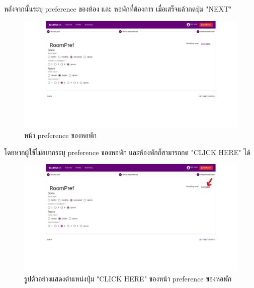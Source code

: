 หลังจากนั้นระบุ preference ของห้อง และ หอพักที่ต้องการ เมื่อเสร็จแล้วกดปุ่ม "NEXT"
\begin{figure}[h]
  \begin{center}
    \includegraphics[width=\linewidth]{photo/web/student/dorm-def.jpeg}
  \end{center}
  \caption{หน้า preference ของหอพัก}
\end{figure}
%
\newline
โดยหากผู้ใช้ไม่อยากระบุ preference ของหอพัก และห้องพักก็สามารถกด "CLICK HERE" ได้
\begin{figure}[h]
  \begin{center}
    \includegraphics[width=\linewidth]{photo/web/student/dorm-gambler.jpeg}
  \end{center}
  \caption{รูปตัวอย่างแสดงตำแหน่งปุ่ม "CLICK HERE" ของหน้า preference ของหอพัก}
\end{figure}
\newpage
%
